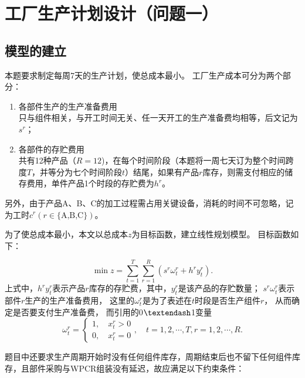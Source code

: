 \section{工厂生产计划设计（问题一）} %
\label{sec:工厂生产计划设计_问题一_}

\subsection{模型的建立} %
\label{sub:模型的建立}

本题要求制定每周7天的生产计划，使总成本最小。
工厂生产成本可分为两个部分：
\begin{enumerate}
	\item 各部件生产的生产准备费用\\
只与组件相关，与开工时间无关、任一天开工的生产准备费均相等，后文记为$s^r$；
	\item 各部件的存贮费用\\
共有12种产品（$R=12$)，在每个时间阶段（本题将一周七天订为整个时间跨度$T$，并等分为七个时间阶段$t$）结尾，如果有产品$r$库存，则需支付相应的储存费用，单件产品1个时段的存贮费为$h^r$。
\end{enumerate}
另外，由于产品A、B、C的加工过程需占用关键设备，消耗的时间不可忽略，记为工时$c^r(r\in \text{\{A,B,C\}})$。

为了使总成本最小，本文以总成本$z$为目标函数，建立线性规划模型。
目标函数如下：

\begin{equation}
	\min z=\sum_{t=1}^{T} \sum_{r=1}^{R}\left(s^{r} \omega_{t}^{r}+h^{r} y_{t}^{r}\right).
\end{equation}
上式中，$h^{r} y_{t}^{r}$表示产品$r$库存的存贮费，其中，$y_{t}^{r}$是该产品的存贮数量；
$s^{r} \omega_{t}^{r}$表示部件$r$生产的生产准备费用，
这里的$\omega_{t}^{r}$是为了表述在$t$时段是否生产组件$r$， 从而确定是否要支付生产准备费， 而引用的0$\textendash$1变量
\begin{equation}
	\omega_{t}^{r}=\left\{\begin{array}{l}
1, \quad x_{t}^{r}>0 \\
0, \quad x_{t}^{r}=0
\end{array},\quad t=1,2, \cdots, T, r=1,2, \cdots, R.\right.
\end{equation}

题目中还要求生产周期开始时没有任何组件库存，周期结束后也不留下任何组件库存，且部件采购与WPCR组装没有延迟，故应满足以下约束条件：

